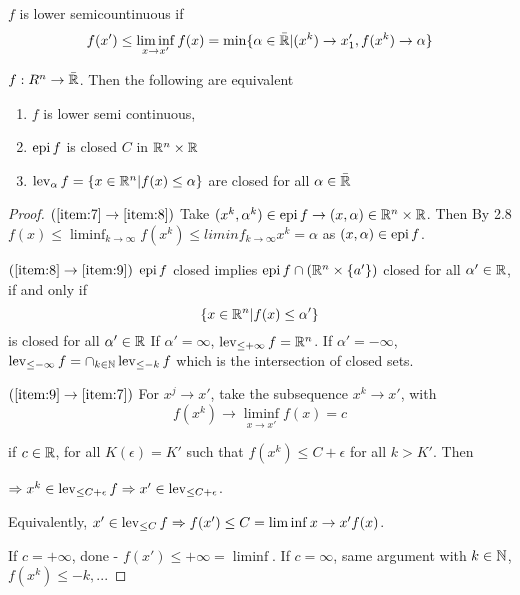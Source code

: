 \begin{defn}
  \label{defn:new_convex:2}
  $f$ is lower semicountinuous if
  \begin{equation}
    \label{eq:6}
    f(x') \leq \liminf_{x \rightarrow x'} f(x) = \min \{\alpha \in \bar
    {\mathbb{R}} | (x^{k}) \rightarrow x_{1}', f(x^{k}) \rightarrow \alpha \}
  \end{equation}

\end{defn}

\begin{thm}
  \label{defn:new_convex:1}
  $f: R^{n} \rightarrow \bar {\mathbb{R}}$.  Then the following are equivalent
  \begin{enumerate}
  \item \label{item:7} $f$ is lower semi continuous,
  \item \label{item:8} $\operatorname*{epi} f$ is closed $C$ in $\mathbb{R}^{n} \times \mathbb{R}$
  \item \label{item:9} $\operatorname*{lev}_{\alpha} f = \{ x \in \mathbb{R}^{n} | f(x) \leq \alpha \}$ are closed
    for all $\alpha \in \bar {\mathbb{R}}$
  \end{enumerate}
\end{thm}

\begin{proof}
  $(\ref{item:7} \rightarrow \ref{item:8})$ Take $(x^{k}, \alpha^{k})
  \in \operatorname*{epi} f \rightarrow (x, \alpha) \in \mathbb{R}^{n} \times \mathbb{R}$. Then By
  2.8 $f(x) \leq \liminf_{k \rightarrow \infty} f(x^{k}) \leq
  liminf_{k \rightarrow \infty} x^{k} = \alpha$ as $(x, \alpha) \in
  \operatorname*{epi} f$.

  $(\ref{item:8} \rightarrow \ref{item:9})$ $\operatorname*{epi} f$ closed implies
  $\operatorname*{epi} f \cap (\mathbb{R}^{n} \times \{ a' \})$ closed for all $\alpha' \in
  \mathbb{R}$, if and only if
  \begin{equation}
    \label{eq:7}
    \{ x \in \mathbb{R}^{n} | f(x) \leq \alpha' \}
  \end{equation} is closed for all $\alpha' \in \mathbb{R}$
  If $\alpha' = \infty$, $\operatorname*{lev}_{\leq +\infty}f = \mathbb{R}^{n}$.
  If $\alpha' = -\infty$, $\operatorname*{lev}_{\leq -\infty} f = \cap_{k \in \mathbb{N}}
    \operatorname*{lev}_{\leq -k} f$ which is the intersection of closed sets.
  
  $(\ref{item:9} \rightarrow \ref{item:7})$ For $x^{j} \rightarrow x'$, take the subsequence $x^{k}
  \rightarrow x'$, with
  \begin{equation}
    \label{eq:8}
    f(x^{k}) \rightarrow \liminf_{x \rightarrow x'} f(x) = c
  \end{equation}

  if $c \in \mathbb{R}$, for all $K(\epsilon) = K'$ such that $f(x^{k}) \leq C
  + \epsilon$ for all $k > K'$. Then

  $\Rightarrow x^{k} \in \operatorname*{lev}_{\leq C + \epsilon} f \Rightarrow x' \in
  \operatorname*{lev}_{\leq C + \epsilon}$.

  Equivalently, $x' \in \operatorname*{lev}_{\leq C} f \Rightarrow f(x') \leq C =
  \liminf{x \rightarrow x'} f(x)$.

  If $c = +\infty$, done - $f(x') \leq +\infty = \liminf$.
  If $c = \infty$, same argument with $k \in \mathbb{N}$, $f(x^{k}) \leq -k, ..$.
\end{proof}




